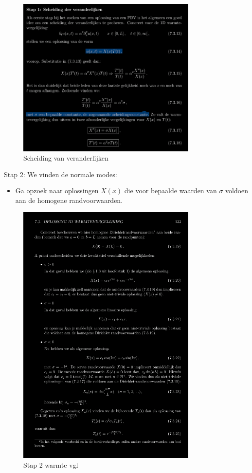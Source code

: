 \documentclass[a4paper]{report}
\begin{document}
\begin{figure}[H]
	\centering
	\includegraphics[width=0.8\textwidth]{assets/scheiding_vn_veranderlijken.png}
	\caption{Scheiding van veranderlijken}
	\label{fig:scheiding_vn_veranderlijken}
\end{figure}

Stap 2: We vinden de normale modes:

\begin{itemize}
	\item Ga opzoek naar oplossingen $X(x)$ die voor bepaalde waarden van $\sigma$ voldoen aan de homogene randvoorwaarden.
\end{itemize}

\begin{figure}[H]
	\centering
	\includegraphics[width=0.8\textwidth]{assets/stap_2_warmte_vgl.png}
	\caption{Stap 2 warmte vgl}
	\label{fig:stap_2_warmte_vgl}
\end{figure}
\end{document}
